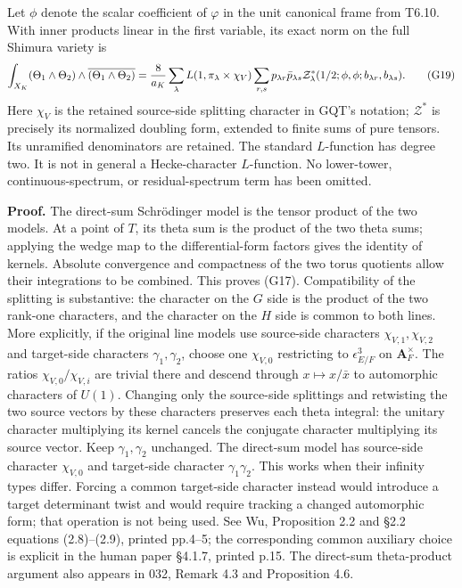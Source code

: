 Let \(\phi\) denote the scalar coefficient of \(\varphi\) in the unit canonical frame from T6.10. With inner products linear in the first variable, its exact norm on the full Shimura variety is \[
\int_{X_K}(\Theta_1\wedge\Theta_2)\wedge
                 \overline{(\Theta_1\wedge\Theta_2)}
={8\over a_K}\sum_\lambda L(1,\pi_\lambda\times\chi_V)
\sum_{r,s}p_{\lambda r}\bar p_{\lambda s}
\mathcal Z^*_{\lambda}(1/2;\phi,\phi;b_{\lambda r},b_{\lambda s}).
\tag{G19}
\] Here \(\chi_V\) is the retained source-side splitting character in GQT's notation; \(\mathcal Z^*\) is precisely its normalized doubling form, extended to finite sums of pure tensors. Its unramified denominators are retained. The standard \(L\)-function has degree two. It is not in general a Hecke-character \(L\)-function. No lower-tower, continuous-spectrum, or residual-spectrum term has been omitted.

\textbf{Proof.} The direct-sum Schrödinger model is the tensor product of the two models. At a point of \(T\), its theta sum is the product of the two theta sums; applying the wedge map to the differential-form factors gives the identity of kernels. Absolute convergence and compactness of the two torus quotients allow their integrations to be combined. This proves (G17). Compatibility of the splitting is substantive: the character on the \(G\) side is the product of the two rank-one characters, and the character on the \(H\) side is common to both lines. More explicitly, if the original line models use source-side characters \(\chi_{V,1},\chi_{V,2}\) and target-side characters \(\gamma_1,\gamma_2\), choose one \(\chi_{V,0}\) restricting to \(\epsilon_{E/F}^{3}\) on \(\mathbf A_F^\times\). The ratios \(\chi_{V,0}/\chi_{V,i}\) are trivial there and descend through \(x\mapsto x/\bar x\) to automorphic characters of \(U(1)\). Changing only the source-side splittings and retwisting the two source vectors by these characters preserves each theta integral: the unitary character multiplying its kernel cancels the conjugate character multiplying its source vector. Keep \(\gamma_1,\gamma_2\) unchanged. The direct-sum model has source-side character \(\chi_{V,0}\) and target-side character \(\gamma_1\gamma_2\). This works when their infinity types differ. Forcing a common target-side character instead would introduce a target determinant twist and would require tracking a changed automorphic form; that operation is not being used. See Wu, Proposition 2.2 and §2.2 equations (2.8)--(2.9), printed pp.4--5; the corresponding common auxiliary choice is explicit in the human paper §4.1.7, printed p.15. The direct-sum theta-product argument also appears in 032, Remark 4.3 and Proposition 4.6.


